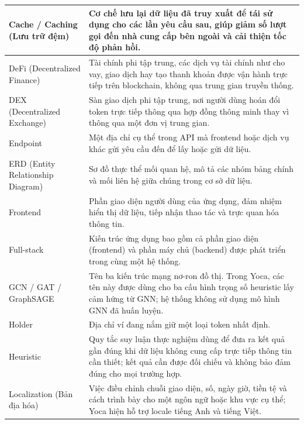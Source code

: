 \begin{longtable}{|L{3.8cm}|L{11.2cm}|}
Cache / Caching (Lưu trữ đệm) & Cơ chế lưu lại dữ liệu đã truy xuất để tái sử dụng cho các lần yêu cầu sau, giúp giảm số lượt gọi đến nhà cung cấp bên ngoài và cải thiện tốc độ phản hồi. \\
\hline

DeFi (Decentralized Finance) & Tài chính phi tập trung, các dịch vụ tài chính như cho vay, giao dịch hay tạo thanh khoản được vận hành trực tiếp trên blockchain, không qua trung gian truyền thống. \\
\hline

DEX (Decentralized Exchange) & Sàn giao dịch phi tập trung, nơi người dùng hoán đổi token trực tiếp thông qua hợp đồng thông minh thay vì thông qua một đơn vị trung gian. \\
\hline

Endpoint & Một địa chỉ cụ thể trong API mà frontend hoặc dịch vụ khác gửi yêu cầu đến để lấy hoặc gửi dữ liệu. \\
\hline

ERD (Entity Relationship Diagram) & Sơ đồ thực thể mối quan hệ, mô tả các nhóm bảng chính và mối liên hệ giữa chúng trong cơ sở dữ liệu. \\
\hline

Frontend & Phần giao diện người dùng của ứng dụng, đảm nhiệm hiển thị dữ liệu, tiếp nhận thao tác và trực quan hóa thông tin. \\
\hline

Full-stack & Kiến trúc ứng dụng bao gồm cả phần giao diện (frontend) và phần máy chủ (backend) được phát triển trong cùng một hệ thống. \\
\hline

GCN / GAT / GraphSAGE & Tên ba kiến trúc mạng nơ-ron đồ thị. Trong Yoca, các tên này được dùng cho ba cấu hình trọng số heuristic lấy cảm hứng từ GNN; hệ thống không sử dụng mô hình GNN đã huấn luyện. \\
\hline

Holder & Địa chỉ ví đang nắm giữ một loại token nhất định. \\
\hline

Heuristic & Quy tắc suy luận thực nghiệm dùng để đưa ra kết quả gần đúng khi dữ liệu không cung cấp trực tiếp thông tin cần thiết; kết quả cần được đối chiếu và không bảo đảm đúng cho mọi trường hợp. \\
\hline

Localization (Bản địa hóa) & Việc điều chỉnh chuỗi giao diện, số, ngày giờ, tiền tệ và cách trình bày cho một ngôn ngữ hoặc khu vực cụ thể; Yoca hiện hỗ trợ locale tiếng Anh và tiếng Việt. \\
\hline


\end{longtable}
